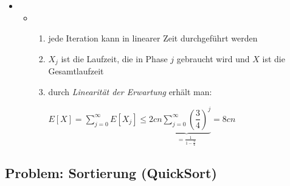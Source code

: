 \topbreak\up\up
\begin{itemize}
	\item[]
			\begin{itemize}
				\item[]
					\begin{enumerate}
						\setcounter{enumi}{\value{temp}}
						\item jede Iteration kann in linearer Zeit durchgeführt werden
						\item $X_j$ ist die Laufzeit, die in Phase $j$ gebraucht wird und $X$ ist die Gesamtlaufzeit
						\item durch \textit{Linearität der Erwartung} erhält man:
							\begin{center}
								$E[X]=\sum\limits_{j=0}^{\infty}E[X_j]\leq 2cn \underbrace{\sum\limits_{j=0}^{\infty} \left(\dfrac{3}{4}\right)^j}_{=\frac{1}{1-\frac{3}{4}}} = 8cn$
							\end{center}
					\end{enumerate}
			\end{itemize}
\end{itemize}
\vspace*{-0.75\baselineskip}\subsection*{Problem: Sortierung (QuickSort)}
